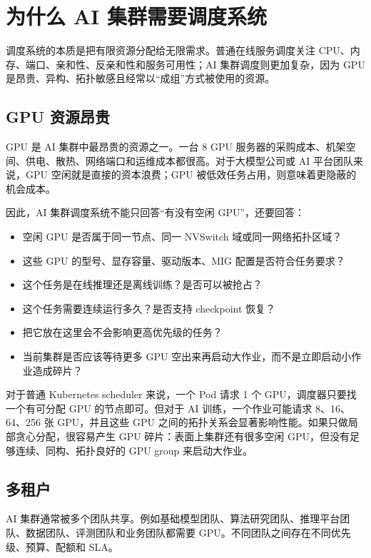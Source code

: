 \section{为什么 AI 集群需要调度系统}
\label{sec:why-ai-cluster-scheduler}

调度系统的本质是把有限资源分配给无限需求。普通在线服务调度关注 CPU、内存、端口、亲和性、反亲和性和服务可用性；AI 集群调度则更加复杂，因为 GPU 是昂贵、异构、拓扑敏感且经常以“成组”方式被使用的资源。

\subsection{GPU 资源昂贵}
\label{subsec:gpu-expensive}

GPU 是 AI 集群中最昂贵的资源之一。一台 8 GPU 服务器的采购成本、机架空间、供电、散热、网络端口和运维成本都很高。对于大模型公司或 AI 平台团队来说，GPU 空闲就是直接的资本浪费；GPU 被低效任务占用，则意味着更隐蔽的机会成本。

因此，AI 集群调度系统不能只回答“有没有空闲 GPU”，还要回答：

\begin{itemize}
  \item 空闲 GPU 是否属于同一节点、同一 NVSwitch 域或同一网络拓扑区域？
  \item 这些 GPU 的型号、显存容量、驱动版本、MIG 配置是否符合任务要求？
  \item 这个任务是在线推理还是离线训练？是否可以被抢占？
  \item 这个任务需要连续运行多久？是否支持 checkpoint 恢复？
  \item 把它放在这里会不会影响更高优先级的任务？
  \item 当前集群是否应该等待更多 GPU 空出来再启动大作业，而不是立即启动小作业造成碎片？
\end{itemize}

对于普通 Kubernetes scheduler 来说，一个 Pod 请求 1 个 GPU，调度器只要找一个有可分配 GPU 的节点即可。但对于 AI 训练，一个作业可能请求 8、16、64、256 张 GPU，并且这些 GPU 之间的拓扑关系会显著影响性能。如果只做局部贪心分配，很容易产生 GPU 碎片：表面上集群还有很多空闲 GPU，但没有足够连续、同构、拓扑良好的 GPU group 来启动大作业。

\subsection{多租户}
\label{subsec:multi-tenancy}

AI 集群通常被多个团队共享。例如基础模型团队、算法研究团队、推理平台团队、数据团队、评测团队和业务团队都需要 GPU。不同团队之间存在不同优先级、预算、配额和 SLA。

